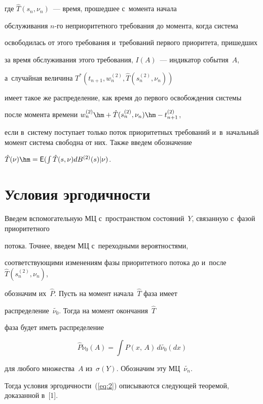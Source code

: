 где $\hat{T}(s_{n},\nu_{n})$~--- время, прошедшее с~момента начала

обслуживания $n$-го неприоритетного требования до момента, когда система

освободилась от этого требования и~требований первого приоритета, пришедших

за время обслуживания этого требования, $I(A)$~--- индикатор события~$A$, 

а~случайная величина $T^{*}(t_{n+1},w_{n}^{(2)},\hat{T}(s_{n}^{(2)},\nu_{n}))$

имеет такое же распределение, как время до первого освобождения системы

после момента времени $w_{n}^{(2)}\hm+\hat{T}(s_{n}^{(2)},\nu_{n})\hm-t_{n+1}^{(2)}$,

если в~сис\-те\-му поступает только поток приоритетных требований и~в~начальный момент сис\-те\-ма свободна от них. Также введем обозначение

$\hat{T}(\nu)\hm={\sf E}(\int\hat{T}(s,\nu)dB^{(2)}(s)|\nu)$.






\section{Условия эргодичности}



Введем вспомогательную МЦ с~пространством состояний~$Y$, связанную с~фазой приоритетного

потока. Точнее, введем МЦ с~переходными вероятностями,

соответствующими изменениям фазы приоритетного потока до и~после $\hat{T}(s_{n}^{(2)},\nu_{n})$,

обозначим их~$\hat{P}$. Пусть на момент начала~$\hat{T}$ фаза имеет

распределение~$\tilde{\nu_{0}}$. Тогда на момент окончания~$\hat{T}$

фаза будет иметь распределение 

$$

\hat{P}\tilde{\nu}_{0}(A)=\int P(x,\,A)\,d\tilde{\nu_{0}}(dx)

$$ 

для любого множества~$A$ из~$\sigma(Y)$. Обозначим эту МЦ~$\tilde{\nu_{n}}$.

Тогда условия эргодичности~(\ref{eq:2}) описываются следующей теоремой, доказанной в~[1].



